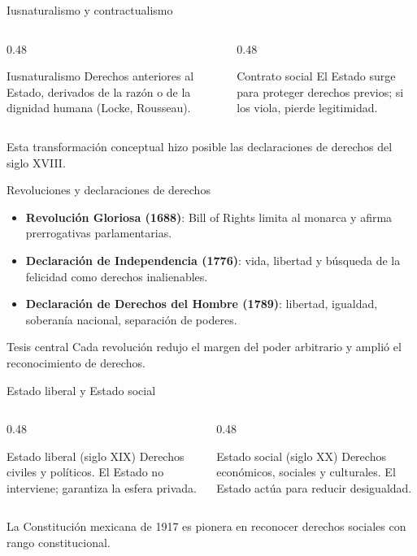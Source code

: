 \documentclass[
  spanish,
  aspectratio=169,
  xcolor={dvipsnames,table}
]{beamer}
\begin{document}
\begin{frame}{Iusnaturalismo y contractualismo}
  \begin{columns}[T]
    \begin{column}{0.48\linewidth}
      \begin{block}{Iusnaturalismo}
        Derechos anteriores al Estado, derivados de la razón o de la dignidad humana (Locke, Rousseau).
      \end{block}
    \end{column}
    \begin{column}{0.48\linewidth}
      \begin{block}{Contrato social}
        El Estado surge para proteger derechos previos; si los viola, pierde legitimidad.
      \end{block}
    \end{column}
  \end{columns}
  \vspace{0.25cm}
  Esta transformación conceptual hizo posible las declaraciones de derechos del siglo XVIII.
\end{frame}

\begin{frame}{Revoluciones y declaraciones de derechos}
  \begin{itemize}
    \item \textbf{Revolución Gloriosa (1688)}: Bill of Rights limita al monarca y afirma prerrogativas parlamentarias.
    \item \textbf{Declaración de Independencia (1776)}: vida, libertad y búsqueda de la felicidad como derechos inalienables.
    \item \textbf{Declaración de Derechos del Hombre (1789)}: libertad, igualdad, soberanía nacional, separación de poderes.
  \end{itemize}
  \begin{block}{Tesis central}
    Cada revolución redujo el margen del poder arbitrario y amplió el reconocimiento de derechos.
  \end{block}
\end{frame}

\begin{frame}{Estado liberal y Estado social}
  \begin{columns}[T]
    \begin{column}{0.48\linewidth}
      \begin{block}{Estado liberal (siglo XIX)}
        Derechos civiles y políticos. El Estado no interviene; garantiza la esfera privada.
      \end{block}
    \end{column}
    \begin{column}{0.48\linewidth}
      \begin{block}{Estado social (siglo XX)}
        Derechos económicos, sociales y culturales. El Estado actúa para reducir desigualdad.
      \end{block}
    \end{column}
  \end{columns}
  \vspace{0.25cm}
  La Constitución mexicana de 1917 es pionera en reconocer derechos sociales con rango constitucional.
\end{frame}
\end{document}
